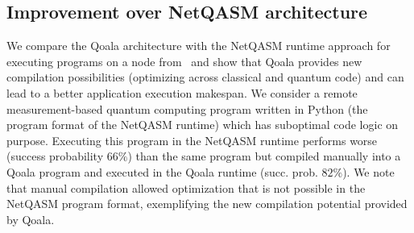 \subsection{Improvement over NetQASM architecture}
\label{qoala:sec:improvement_over_netqasm}
We compare the Qoala architecture with the NetQASM runtime approach for executing programs on a node from~\cite{dahlberg2022netqasm}
and show that Qoala provides new compilation possibilities (optimizing across classical and quantum code) and can lead to a better application execution makespan.
We consider a remote measurement-based quantum computing program written in Python (the program format of the NetQASM runtime) which has suboptimal code logic on purpose.
Executing this program in the NetQASM runtime performs worse (success probability $66\%$) than the same program but compiled manually into a Qoala program and executed in the Qoala runtime (succ. prob. $82\%$).
We note that manual compilation allowed optimization that is not possible in the NetQASM program format, exemplifying the new compilation potential provided by Qoala.

